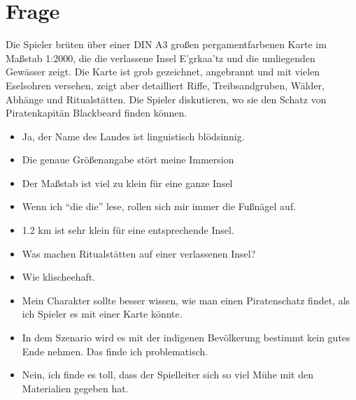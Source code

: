 \documentclass{article}
\newcommand\frage[1]{\section{Frage}\label{#1}}
\begin{document}
\frage{karte}
Die Spieler brüten über einer DIN A3 großen pergamentfarbenen Karte im Maßstab 1:2000, die die verlassene Insel E'grkaa'tz und die umliegenden Gewässer zeigt. Die Karte ist grob gezeichnet, angebrannt und mit vielen Eselsohren versehen, zeigt aber detailliert Riffe, Treibsandgruben, Wälder, Abhänge und Ritualstätten. Die Spieler diskutieren, wo sie den Schatz von Piratenkapitän Blackbeard finden können.
\begin{itemize}
\item Ja, der Name des Landes ist linguistisch blödsinnig.
\item Die genaue Größenangabe stört meine Immersion
\item Der Maßstab ist viel zu klein für eine ganze Insel
\item Wenn ich “die die” lese, rollen sich mir immer die Fußnägel auf.
\item 1.2 km ist sehr klein für eine entsprechende Insel.
\item Was machen Ritualstätten auf einer verlassenen Insel?
\item Wie klischeehaft.
\item Mein Charakter sollte besser wissen, wie man einen Piratenschatz findet, als ich Spieler es mit einer Karte könnte.
\item In dem Szenario wird es mit der indigenen Bevölkerung bestimmt kein gutes Ende nehmen. Das finde ich problematisch.

\item Nein, ich finde es toll, dass der Spielleiter sich so viel Mühe mit den Materialien gegeben hat.
\end{itemize}
\end{document}

